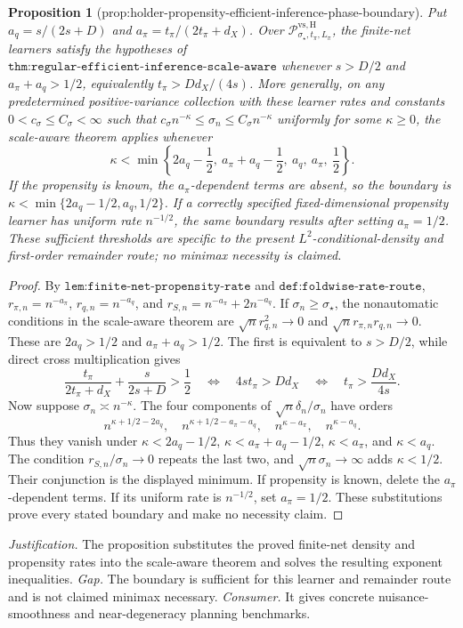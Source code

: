 \documentclass{article}
\newtheorem{proposition}{Proposition}
\begin{document}
\begin{proposition}[prop:holder-propensity-efficient-inference-phase-boundary]\label{prop:holder-propensity-efficient-inference-phase-boundary}
Put \(a_q=s/(2s+D)\) and \(a_\pi=t_\pi/(2t_\pi+d_X)\). Over \(\mathscr P^{\mathrm{vs,H}}_{\sigma_\star,t_\pi,L_\pi}\), the finite-net learners satisfy the hypotheses of \(\texttt{thm:regular-efficient-inference-scale-aware}\) whenever \(s>D/2\) and \(a_\pi+a_q>1/2\), equivalently \(t_\pi>Dd_X/(4s)\). More generally, on any predetermined positive-variance collection with these learner rates and constants \(0<c_\sigma\le C_\sigma<\infty\) such that \(c_\sigma n^{-\kappa}\le\sigma_n\le C_\sigma n^{-\kappa}\) uniformly for some \(\kappa\ge0\), the scale-aware theorem applies whenever
\[
\kappa<\min\left\{2a_q-\frac12,\ a_\pi+a_q-\frac12,\ a_q,\ a_\pi,\ \frac12\right\}.
\]
If the propensity is known, the \(a_\pi\)-dependent terms are absent, so the boundary is \(\kappa<\min\{2a_q-1/2,a_q,1/2\}\). If a correctly specified fixed-dimensional propensity learner has uniform rate \(n^{-1/2}\), the same boundary results after setting \(a_\pi=1/2\). These sufficient thresholds are specific to the present \(L^2\)-conditional-density and first-order remainder route; no minimax necessity is claimed.
\end{proposition}
\begin{proof}
By \(\texttt{lem:finite-net-propensity-rate}\) and \(\texttt{def:foldwise-rate-route}\), \(r_{\pi,n}=n^{-a_\pi}\), \(r_{q,n}=n^{-a_q}\), and \(r_{S,n}=n^{-a_\pi}+2n^{-a_q}\). If \(\sigma_n\ge\sigma_\star\), the nonautomatic conditions in the scale-aware theorem are \(\sqrt n r_{q,n}^2\to0\) and \(\sqrt n r_{\pi,n}r_{q,n}\to0\). These are \(2a_q>1/2\) and \(a_\pi+a_q>1/2\). The first is equivalent to \(s>D/2\), while direct cross multiplication gives
\[\frac{t_\pi}{2t_\pi+d_X}+\frac{s}{2s+D}>\frac12\quad\Longleftrightarrow\quad 4st_\pi>Dd_X\quad\Longleftrightarrow\quad t_\pi>\frac{Dd_X}{4s}.\tag{1}\]
Now suppose \(\sigma_n\asymp n^{-\kappa}\). The four components of \(\sqrt n\delta_n/\sigma_n\) have orders
\[n^{\kappa+1/2-2a_q},\quad n^{\kappa+1/2-a_\pi-a_q},\quad n^{\kappa-a_\pi},\quad n^{\kappa-a_q}.\tag{2}\]
Thus they vanish under \(\kappa<2a_q-1/2\), \(\kappa<a_\pi+a_q-1/2\), \(\kappa<a_\pi\), and \(\kappa<a_q\). The condition \(r_{S,n}/\sigma_n\to0\) repeats the last two, and \(\sqrt n\sigma_n\to\infty\) adds \(\kappa<1/2\). Their conjunction is the displayed minimum. If propensity is known, delete the \(a_\pi\)-dependent terms. If its uniform rate is \(n^{-1/2}\), set \(a_\pi=1/2\). These substitutions prove every stated boundary and make no necessity claim.
\end{proof}
\par\smallskip\noindent \textit{Justification.} The proposition substitutes the proved finite-net density and propensity rates into the scale-aware theorem and solves the resulting exponent inequalities. \textit{Gap.} The boundary is sufficient for this learner and remainder route and is not claimed minimax necessary. \textit{Consumer.} It gives concrete nuisance-smoothness and near-degeneracy planning benchmarks.
\end{document}
